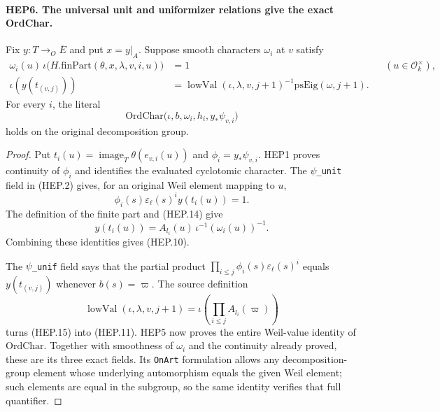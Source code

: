 \paragraph{HEP6. The universal unit and uniformizer relations give the exact OrdChar.}
\label{claim:HEP6}
Fix $y:T\to_O\overline E$ and put $x=y|_A$.
Suppose smooth characters $\omega_i$ at $v$ satisfy
\begin{align}
 \omega_i(u)\,\iota\bigl(H.\mathrm{finPart}(\theta,x,\lambda,v,i,u)\bigr)
       &=1 &&(u\in\mathcal O_k^\times), \tag{HEP.14}\\
 \iota(y(t_{(v,j)}))
       &=\operatorname{lowVal}(\iota,\lambda,v,j+1)^{-1}
                                      \mathrm{psEig}(\omega,j+1).
                                                        \tag{HEP.15}
\end{align}
For every $i$, the literal
\[
 \mathrm{OrdChar}\bigl(\iota,b,\omega_i,h_i,
                                      y_*\psi_{v,i}\bigr)
 \tag{HEP.16}
\]
holds on the original decomposition group.
\begin{proof}
Put $t_i(u)=\operatorname{image}_T\theta(e_{v,i}(u))$ and
$\phi_i=y_*\psi_{v,i}$.  HEP1 proves continuity of $\phi_i$
and identifies the evaluated cyclotomic character.
The \texttt{\(\psi\)\_unit} field in (HEP.2) gives, for an
original Weil element mapping to $u$,
\[
                 \phi_i(s)\varepsilon_\ell(s)^i y(t_i(u))=1.
\]
The definition of the finite part and (HEP.14) give
\[
                  y(t_i(u))=A_{l_i}(u)\,
                                   \iota^{-1}(\omega_i(u))^{-1}.
\]
Combining these identities gives (HEP.10).

The \texttt{\(\psi\)\_unif} field says that the partial product
$\prod_{i\leq j}\phi_i(s)\varepsilon_\ell(s)^i$ equals
$y(t_{(v,j)})$ whenever $b(s)=\varpi$.
The source definition
\[
 \operatorname{lowVal}(\iota,\lambda,v,j+1)
            =\iota\left(\prod_{i\leq j}A_{l_i}(\varpi)\right)
\]
turns (HEP.15) into (HEP.11).  HEP5 now proves the entire
Weil-value identity of $\mathrm{OrdChar}$.
Together with smoothness of $\omega_i$ and the continuity already
proved, these are its three exact fields.  Its \texttt{OnArt}
formulation allows any decomposition-group element whose underlying
automorphism equals the given Weil element; such elements are equal
in the subgroup, so the same identity verifies that full quantifier.
\end{proof}

